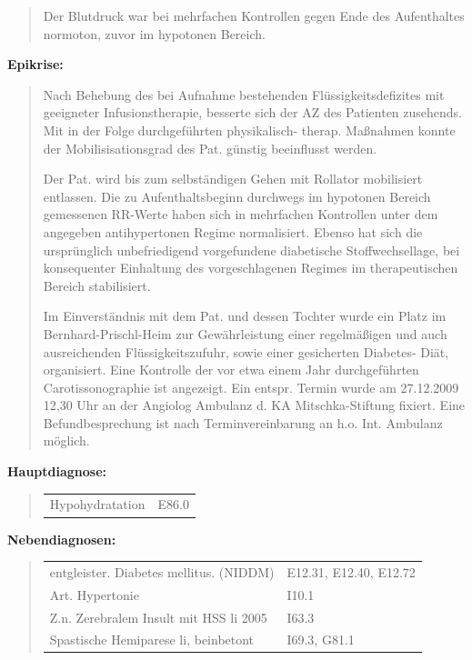 {\begin{quote}
Der Blutdruck war bei mehrfachen Kontrollen gegen Ende des
Aufenthaltes normoton, zuvor im hypotonen Bereich.
\end{quote}




{\bfseries Epikrise:}

\begin{quote}
  Nach Behebung des bei Aufnahme bestehenden
  Flüssigkeitsdefizites mit geeigneter Infusionstherapie,
  besserte sich der AZ des Patienten zusehends. Mit in der
  Folge durchgeführten physi\-ka\-lisch- therap. Maßnahmen
  konnte der Mobilisisationsgrad des Pat. günstig
  beeinflusst werden.
  
  Der Pat. wird bis zum selbständigen Gehen mit Rollator
  mobilisiert entlassen. Die zu Aufenthaltsbeginn durchwegs
  im hypotonen Bereich gemessenen RR-Werte haben sich in
  mehrfachen Kontrollen unter dem angegeben antihypertonen
  Regime normalisiert. Ebenso hat sich die ursprünglich
  unbefriedigend vorgefundene diabetische Stoffwechsellage,
  bei konsequenter Einhaltung des vorgeschlagenen Regimes im
  therapeutischen Bereich stabilisiert.
  
  Im Einverständnis mit dem Pat. und dessen Tochter wurde
  ein Platz im Bernhard-Prischl-Heim zur Gewährleistung
  einer regelmäßigen und auch ausreichenden
  Flüssigkeitszufuhr, sowie einer gesicherten Diabetes-
  Diät, organisiert. Eine Kontrolle der vor etwa einem Jahr
  durchgeführten Carotissonographie ist
  angezeigt. Ein entspr. Termin wurde am 27.12.2009  12,30
  Uhr an der Angiolog Ambulanz d. KA Mitschka-Stiftung
  fixiert. Eine Befund\-be\-sprech\-ung ist nach
  Terminvereinbarung an h.o. Int. Ambulanz möglich.
\end{quote}

\MarginNo{\Z{}}
{\bfseries Hauptdiagnose:}

\begin{quote}
\begin{tabular}{ll}
Hypohydratation & E86.0
\\
\end{tabular}
\end{quote}

{\bfseries Nebendiagnosen:}

\begin{quote}
\begin{tabular}{ll}
entgleister. Diabetes mellitus. (NIDDM) & E12.31, E12.40,
E12.72
\\
Art. Hypertonie & I10.1
\\
Z.n. Zerebralem Insult mit HSS li 2005& I63.3
\\
Spastische Hemiparese li, beinbetont&I69.3, G81.1
\\
\end{tabular}
\end{quote}



}
